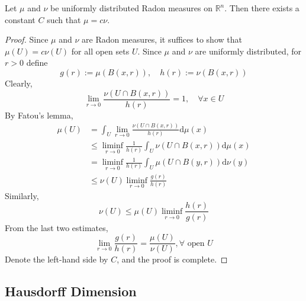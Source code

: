     \begin{theorem}\label{thm:uniform-radon-unique}
        Let $\mu$ and $\nu$ be uniformly distributed Radon measures on $\mathbb{R}^{n}$. Then there exists a constant $C$ such that $\mu=c \nu$.
    \end{theorem}
    \begin{proof}
        Since $\mu$ and $\nu$ are Radon measures, it suffices to show that $\mu(U)=c\nu(U)$ for all open sets $U$. Since $\mu$ and $\nu$ are uniformly distributed, for $r>0$ define
        \[
        g(r) := \mu(B(x,r)),\quad h(r) := \nu(B(x,r))
        \]
        Clearly,
        \[
        \lim_{ r \to 0 } \frac{\nu(U\cap B(x,r))}{h(r)}=1,\quad \forall x \in U
        \]
        By Fatou's lemma,
        \begin{align}
        \mu (U)&=\int _{U}\lim_{ r \to 0 } \frac{\nu(U\cap B(x,r))}{h(r)}\mathrm{d}\mu(x) \\
        &\leq \liminf_{r\to 0} \frac{1}{h(r)} \int _{U}\nu(U\cap B(x,r))\mathrm{d}\mu(x) \\
        &= \liminf_{r\to 0} \frac{1}{h(r)}\int _{U}\mu(U\cap B(y,r))\mathrm{d}\nu(y) \\
        &\leq \nu(U) \liminf_{r\to 0} \frac{g(r)}{h(r)}
        \end{align}
        Similarly,
        \[
        \nu(U)\leq \mu(U)\liminf_{r\to 0} \frac{h(r)}{g(r)}
        \]
        From the last two estimates,
        \[
        \lim_{ r \to 0 } \frac{g(r)}{h(r)}= \frac{\mu(U)}{\nu(U)}, \forall \text{ open }U
        \]
        Denote the left-hand side by $C$, and the proof is complete.
    \end{proof}

    \subsection{Hausdorff Dimension}


